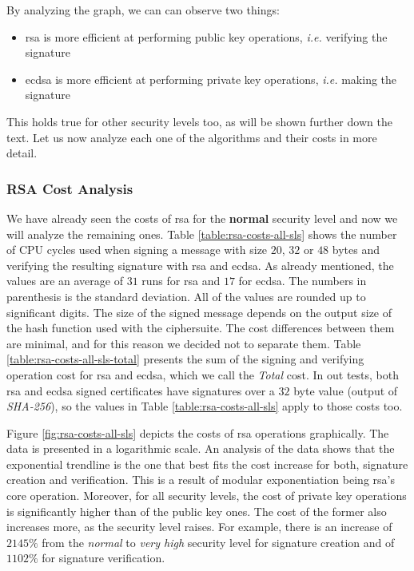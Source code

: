 \documentclass{llncs}
\begin{document}
By analyzing the graph, we can can observe two things:

\begin{itemize}
  \item \gls{rsa} is more efficient at performing public key operations, \textit{i.e.} verifying the signature
  \item \gls{ecdsa} is more efficient at performing private key operations, \textit{i.e.} making the signature
\end{itemize}

This holds true for other security levels too, as will be shown further down the text. Let us now analyze each one
of the algorithms and their costs in more detail.

\subsubsection{RSA Cost Analysis}

We have already seen the costs of \gls{rsa} for the \textbf{normal} security level and now we will analyze the
remaining ones. Table \ref{table:rsa-costs-all-sls} shows the number of CPU cycles used
when signing a message with size $20$, $32$ or $48$ bytes and verifying the resulting signature with \gls{rsa} and \gls{ecdsa}.
As already mentioned, the values are an average of $31$ runs for \gls{rsa} and $17$ for \gls{ecdsa}.
The numbers in parenthesis is the standard deviation. All of the values are rounded up to significant digits. The size of the signed message depends on the output size of the
hash function used with the ciphersuite. The cost differences between them are minimal, and for this reason we decided not to separate them.
Table \ref{table:rsa-costs-all-sls-total} presents the sum of the signing and verifying operation cost for \gls{rsa} and \gls{ecdsa}, which we call the \textit{Total} cost.
In out tests, both \gls{rsa} and \gls{ecdsa} signed certificates have signatures over a $32$ byte value (output of \textit{SHA-256}), so
the values in Table \ref{table:rsa-costs-all-sls} apply to those costs too.

Figure \ref{fig:rsa-costs-all-sls} depicts the costs of \gls{rsa} operations graphically. The data is presented in a logarithmic
scale. An analysis of the data shows that the exponential trendline is the one that best fits the cost increase for both, signature creation and
verification. This is a result of modular exponentiation being \gls{rsa}'s core operation. Moreover, for all security levels, the cost of
private key operations is significantly higher than
of the public key ones. The cost of the former also increases more, as the security level raises. For example, there is an increase
of $2145\%$ from the \textit{normal} to \textit{very high} security level for signature creation and of $1102\%$ for signature verification.
\end{document}
